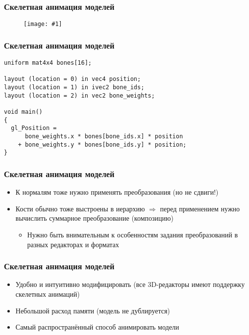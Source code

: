 \documentclass{beamer}
\newcommand{\slideimage}[1]{
  \begin{figure}
    \begin{adjustbox}{width=\textwidth, totalheight=\textheight-2\baselineskip-2\baselineskip,keepaspectratio}
      \texttt{[image: \#1]}
    \end{adjustbox}
  \end{figure}
}
\begin{document}
\begin{frame}[fragile]
\frametitle{Скелетная анимация моделей}
\slideimage{skeletal.jpg}
\end{frame}

\begin{frame}[fragile]
\frametitle{Скелетная анимация моделей}
\begin{verbatim}
uniform mat4x4 bones[16];

layout (location = 0) in vec4 position;
layout (location = 1) in ivec2 bone_ids;
layout (location = 2) in vec2 bone_weights;

void main()
{
  gl_Position =
      bone_weights.x * bones[bone_ids.x] * position
    + bone_weights.y * bones[bone_ids.y] * position;
}
\end{verbatim}
\end{frame}

\begin{frame}[fragile]
\frametitle{Скелетная анимация моделей}
\begin{itemize}
\item К нормалям тоже нужно применять преобразования (но не сдвиги!)
\pause
\item Кости обычно тоже выстроены в иерархию \begin{math}\Rightarrow\end{math} перед применением нужно вычислить суммарное преобразование (композицию)
\begin{itemize}
\item Нужно быть внимательным к особенностям задания преобразований в разных редакторах и форматах
\end{itemize}
\end{itemize}
\end{frame}

\begin{frame}[fragile]
\frametitle{Скелетная анимация моделей}
\begin{itemize}
\item Удобно и интуитивно модифицировать (все 3D-редакторы имеют поддержку скелетных анимаций)
\pause
\item Небольшой расход памяти (модель не дублируется)
\pause
\item Самый распространённый способ анимировать модели
\end{itemize}
\end{frame}
\end{document}

